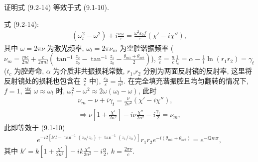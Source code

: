 \documentclass{note}
\begin{document}
\begin{exe}
    证明式 (9.2-14) 等效于式 (9.1-10).
\end{exe}
\begin{pf}
    式 (9.2-14):
    \begin{align}
        (\omega_l^2-\omega^2)+i\frac{\sigma\omega}{\varepsilon}=\frac{\omega^2\varepsilon_0f}{\varepsilon}(\chi'-i\chi''),
    \end{align}
    其中 $\omega=2\pi\nu$ 为激光频率, $\omega_l=2\pi\nu_m$ 为空腔谐振频率 ($\nu_m=\frac{mc}{2nl}+\frac{c}{2\pi nl}\left(\tan^{-1}\frac{z_2}{z_0}-\tan^{-1}\frac{z_1}{z_0}-\frac{\theta_{m1}+\theta_{m2}}{2}\right)$), $\frac{\sigma}{\varepsilon}=\frac{n}{c}\frac{1}{t_c}=\alpha-\frac{1}{l}\ln(r_1r_2)=\gamma_t$ ($t_c$ 为腔寿命, $\alpha$ 为介质非共振损耗常数, $r_1$,$r_2$ 分别为两面反射镜的反射率, 这里将反射镜处的损耗也包含在 $\frac{\sigma}{\varepsilon}$ 中), $\frac{\varepsilon_0}{\varepsilon}=\frac{1}{n^2}$.
    在完全填充谐振腔且均匀翻转的情况下, $f=1$, 当 $\omega\approx\omega_l$ 时, $\omega_l^2-\omega^2\approx 2\omega(\omega_l-\omega)$, 此时
    \begin{gather}
        \nu_m-\nu+i\gamma_t=\frac{\nu}{2n^2}(\chi'-i\chi''),\\
        \Longrightarrow\nu\left[1+\frac{\chi'}{2n^2}\right]-i\nu\frac{\chi''}{2n^2}-i\frac{\gamma_t}{2}=\nu_m,
    \end{gather}
    此即等效于 (9.1-10)
    \begin{align}
        e^{-i2[k'l-\tan^{-1}(z_2/z_0)+\tan^{-1}(z_1/z_0)]}r_1r_2e^{-i(\theta_{m1}+\theta_{m2})}=e^{-i2m\pi},
    \end{align}
    其中 $k'=k\left[1+\frac{\chi'}{2n^2}\right]-ik\frac{\chi''}{2n^2}-i\frac{\alpha}{2}$, $k=\frac{2\pi\nu}{c}$.
\end{pf}
\end{document}
